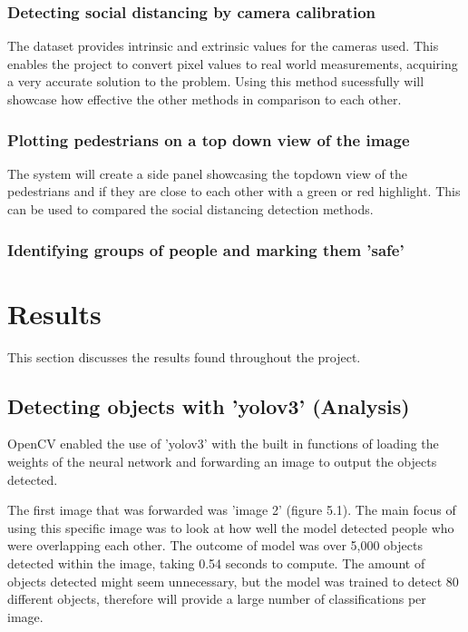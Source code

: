 \documentclass[12pt]{report}
\begin{document}
\subsection*{Detecting social distancing by camera calibration}

The dataset provides intrinsic and extrinsic values for the cameras used. This enables the project to convert pixel values to real world measurements, acquiring a very accurate solution to the problem. Using this method sucessfully will showcase how effective the other methods in comparison to each other.

\subsection*{Plotting pedestrians on a top down view of the image}

The system will create a side panel showcasing the topdown view of the pedestrians and if they are close to each other with a green or red highlight. This can be used to compared the social distancing detection methods.

\subsection*{Identifying groups of people and marking them 'safe'}


\chapter{Results}

This section discusses the results found throughout the project.

\section{Detecting objects with 'yolov3' (Analysis)}

OpenCV enabled the use of 'yolov3' with the built in functions of loading the weights of the neural network and forwarding an image to output the objects detected. 

\vspace{2mm}

The first image that was forwarded was 'image 2' (figure 5.1). The main focus of using this specific image was to look at how well the model detected people who were overlapping each other. The outcome of model was over 5,000 objects detected within the image, taking 0.54 seconds to compute. The amount of objects detected might seem unnecessary, but the model was trained to detect 80 different objects, therefore will provide a large number of classifications per image.
\end{document}

